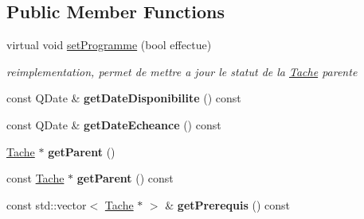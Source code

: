 \subsection*{Public Member Functions}
\begin{DoxyCompactItemize}
\item 
virtual void \hyperlink{class_tache_a662db9ee24100a3d52853542c98dadf7}{set\+Programme} (bool effectue)
\begin{DoxyCompactList}\small\item\em reimplementation, permet de mettre a jour le statut de la \hyperlink{class_tache}{Tache} parente \end{DoxyCompactList}\item 
\hypertarget{class_tache_a49df0845676da96a48b0e229f45d4b08}{}const Q\+Date \& {\bfseries get\+Date\+Disponibilite} () const \label{class_tache_a49df0845676da96a48b0e229f45d4b08}

\item 
\hypertarget{class_tache_a77b8bb68047cae864ebeb19575fcfecd}{}const Q\+Date \& {\bfseries get\+Date\+Echeance} () const \label{class_tache_a77b8bb68047cae864ebeb19575fcfecd}

\item 
\hypertarget{class_tache_a8d3cb6f1e1adc46f938f4cab89e5218b}{}\hyperlink{class_tache}{Tache} $\ast$ {\bfseries get\+Parent} ()\label{class_tache_a8d3cb6f1e1adc46f938f4cab89e5218b}

\item 
\hypertarget{class_tache_a3ea1915199eeb501ed1c5cd871992dd6}{}const \hyperlink{class_tache}{Tache} $\ast$ {\bfseries get\+Parent} () const \label{class_tache_a3ea1915199eeb501ed1c5cd871992dd6}

\item 
\hypertarget{class_tache_ae5f783fff550c19580e3de7c143eab9e}{}const std\+::vector$<$ \hyperlink{class_tache}{Tache} $\ast$ $>$ \& {\bfseries get\+Prerequis} () const \label{class_tache_ae5f783fff550c19580e3de7c143eab9e}


\end{DoxyCompactItemize}
